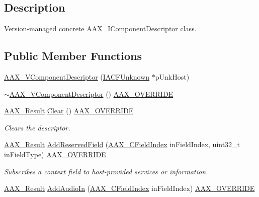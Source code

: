 \subsection{Description}
Version-\/managed concrete \mbox{\hyperlink{a01781}{A\+A\+X\+\_\+\+I\+Component\+Descriptor}} class. \subsection*{Public Member Functions}
\begin{DoxyCompactItemize}
\item 
\mbox{\hyperlink{a01901_ac7afc2d0da1ba680cfe5316facfff038}{A\+A\+X\+\_\+\+V\+Component\+Descriptor}} (\mbox{\hyperlink{a01409}{I\+A\+C\+F\+Unknown}} $\ast$p\+Unk\+Host)
\item 
\mbox{\hyperlink{a01901_a9e49ea29b3d98251bb17542d5c24f711}{$\sim$\+A\+A\+X\+\_\+\+V\+Component\+Descriptor}} () \mbox{\hyperlink{a00392_ac2f24a5172689ae684344abdcce55463}{A\+A\+X\+\_\+\+O\+V\+E\+R\+R\+I\+DE}}
\item 
\mbox{\hyperlink{a00392_a4d8f69a697df7f70c3a8e9b8ee130d2f}{A\+A\+X\+\_\+\+Result}} \mbox{\hyperlink{a01901_a46226eb4c9b31c5c55296bab4f02d91c}{Clear}} () \mbox{\hyperlink{a00392_ac2f24a5172689ae684344abdcce55463}{A\+A\+X\+\_\+\+O\+V\+E\+R\+R\+I\+DE}}
\begin{DoxyCompactList}\small\item\em Clears the descriptor. \end{DoxyCompactList}\item 
\mbox{\hyperlink{a00392_a4d8f69a697df7f70c3a8e9b8ee130d2f}{A\+A\+X\+\_\+\+Result}} \mbox{\hyperlink{a01901_ac84695bd7c0161a2a0b29b9a3515189c}{Add\+Reserved\+Field}} (\mbox{\hyperlink{a00392_ae807f8986143820cfb5d6da32165c9c7}{A\+A\+X\+\_\+\+C\+Field\+Index}} in\+Field\+Index, uint32\+\_\+t in\+Field\+Type) \mbox{\hyperlink{a00392_ac2f24a5172689ae684344abdcce55463}{A\+A\+X\+\_\+\+O\+V\+E\+R\+R\+I\+DE}}
\begin{DoxyCompactList}\small\item\em Subscribes a context field to host-\/provided services or information. \end{DoxyCompactList}\item 
\mbox{\hyperlink{a00392_a4d8f69a697df7f70c3a8e9b8ee130d2f}{A\+A\+X\+\_\+\+Result}} \mbox{\hyperlink{a01901_a612fab50f30f1595bdba9aa001344b44}{Add\+Audio\+In}} (\mbox{\hyperlink{a00392_ae807f8986143820cfb5d6da32165c9c7}{A\+A\+X\+\_\+\+C\+Field\+Index}} in\+Field\+Index) \mbox{\hyperlink{a00392_ac2f24a5172689ae684344abdcce55463}{A\+A\+X\+\_\+\+O\+V\+E\+R\+R\+I\+DE}}

\end{DoxyCompactItemize}
